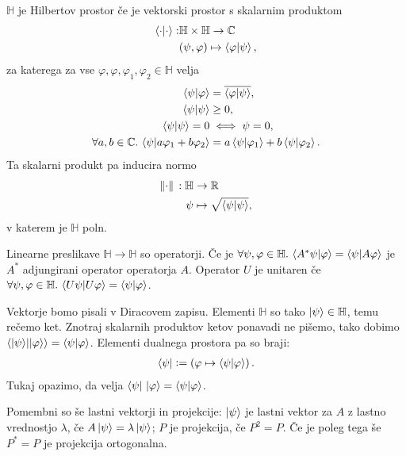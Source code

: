 \documentclass[mat1]{fmfdelo}
\newcommand{\R}{\mathbb R}
\newcommand{\C}{\mathbb C}
\newcommand{\Hb}{\mathbb H}
\renewcommand{\phi}{\varphi}
\newcommand{\defeq}{\vcentcolon=}
\newcommand{\sep}{\ensuremath{.\,}}
\begin{document}
\begin{definicija} \(\Hb\) je Hilbertov prostor če je vektorski prostor s skalarnim produktom
    \begin{align*}
        \braket{\cdot}{\cdot} :& \Hb \times \Hb \to \C\\
        & (\psi, \varphi) \mapsto \braket{\varphi}{\psi},
    \end{align*}
    za katerega za vse \(\phi, \varphi, \varphi_1, \varphi_2 \in \Hb\) velja
    \begin{align*}
        \braket{\psi}{\varphi} &= \overline{\braket{\varphi}{\psi}},\\
        \braket\psi &\geq 0,\\
        \braket\psi = 0 &\iff \psi = 0,\\
        \forall a,b\in\C\sep \braket{\psi}{a\varphi_1 + b\varphi_2} &=a\braket{\psi}{\varphi_1} + b\braket{\psi}{\varphi_2}.
    \end{align*}
    Ta skalarni produkt pa inducira normo
    \begin{align*}
        \norm*{\cdot} : \Hb &\to \R\\
        \psi &\mapsto \sqrt{\braket\psi},
    \end{align*}
    v katerem je \(\Hb\) poln.
\end{definicija}

Linearne preslikave \(\Hb\to\Hb\) so operatorji. Če je \(\forall \psi,\phi\in\Hb\sep\braket{A^*\psi}{\varphi} = \braket{\psi}{A\varphi}\) je \(A^*\) adjungirani operator operatorja \(A\). Operator \(U\) je unitaren če \(\forall \psi,\varphi\in\Hb\sep \braket{U\psi}{U\varphi} = \braket{\psi}{\varphi}\).

Vektorje bomo pisali v Diracovem zapisu. Elementi \(\Hb\) so tako \(\ket{\psi}\in\Hb\), temu rečemo ket. Znotraj skalarnih produktov ketov ponavadi ne pišemo, tako dobimo \(\braket{\ket\psi}{\ket\varphi} = \braket{\psi}{\varphi}\). Elementi dualnega prostora pa so braji:
\begin{align*}
    \bra{\psi} \defeq \left(\varphi \mapsto \braket{\psi}{\varphi} \right).
\end{align*}
Tukaj opazimo, da velja \(\bra{\psi}\, \ket{\varphi} = \braket{\psi}{\varphi}\).

Pomembni so še lastni vektorji in projekcije: \(\ket{\psi}\) je lastni vektor za \(A\) z lastno vrednostjo \(\lambda\), če \(A\ket\psi = \lambda \ket\psi\); \(P\) je projekcija, če \(P^2 = P\). Če je poleg tega še \(P^* = P\) je projekcija ortogonalna.
\end{document}
